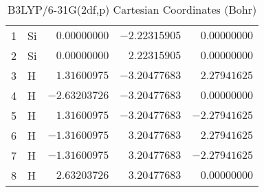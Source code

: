 \documentclass[10pt,oneside]{article}
\begin{document}
\begin{table}[h]
\centering
\caption{B3LYP/6-31G(2df,p) Cartesian Coordinates (Bohr)}
\begin{tabular}{llrrr}
\toprule
1  & Si & $ 0.00000000$ & $-2.22315905$ & $ 0.00000000$ \\
2  & Si & $ 0.00000000$ & $ 2.22315905$ & $ 0.00000000$ \\
3  & H  & $ 1.31600975$ & $-3.20477683$ & $ 2.27941625$ \\
4  & H  & $-2.63203726$ & $-3.20477683$ & $ 0.00000000$ \\
5  & H  & $ 1.31600975$ & $-3.20477683$ & $-2.27941625$ \\
6  & H  & $-1.31600975$ & $ 3.20477683$ & $ 2.27941625$ \\
7  & H  & $-1.31600975$ & $ 3.20477683$ & $-2.27941625$ \\
8  & H  & $ 2.63203726$ & $ 3.20477683$ & $ 0.00000000$ \\
\bottomrule
\end{tabular}
\end{table}
\end{document}
